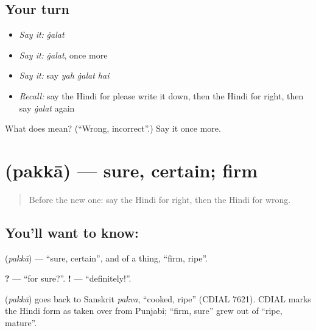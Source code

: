 \subsection*{Your turn}
\begin{itemize}
\raggedright
  \item \emph{Say it:} \emph{ġalat}
  \item \emph{Say it:} \emph{ġalat}, once more
  \item \emph{Say it:} say \emph{yah ġalat hai}
  \item \emph{Recall:} say the Hindi for please write it down, then the Hindi for right, then say \emph{ġalat} again
\end{itemize}

\begin{tcolorbox}[breakable,colback=teal!4,colframe=teal!35!black,title={Before you move on}]
What does  mean? (\textquotedblleft{}Wrong, incorrect\textquotedblright{}.) Say it once more.
\end{tcolorbox}
\section[\texorpdfstring{\hi{पक्का} (pakkā)}{पक्का (pakkā)}]{ (pakkā) — sure, certain; firm}

\label{lesson:HI-C112-pakka}



\begin{quote}
Before the new one: say the Hindi for right, then the Hindi for wrong.
\end{quote}

\subsection*{You'll want to know: }
\textbf{} (\emph{pakkā}) — \textquotedblleft{}sure, certain\textquotedblright{}, and of a thing, \textquotedblleft{}firm, ripe\textquotedblright{}.

\textbf{?} — \textquotedblleft{}for sure?\textquotedblright{}. \textbf{!} — \textquotedblleft{}definitely!\textquotedblright{}.

\begin{cousinweb}
\textbf{} (\emph{pakkā}) goes back to Sanskrit \emph{pakva}, \textquotedblleft{}cooked, ripe\textquotedblright{} (CDIAL 7621). CDIAL marks the Hindi form as taken over from Punjabi; \textquotedblleft{}firm, sure\textquotedblright{} grew out of \textquotedblleft{}ripe, mature\textquotedblright{}.
\end{cousinweb}


